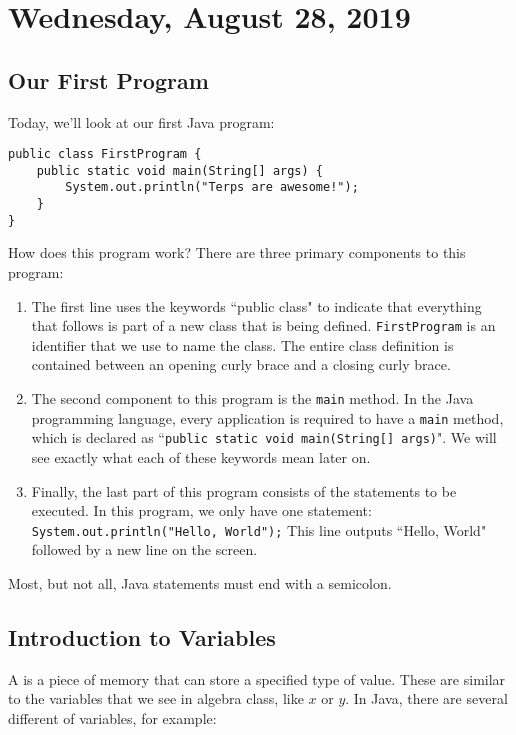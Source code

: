 \section{Wednesday, August 28, 2019}

\subsection{Our First Program}

Today, we'll look at our first Java program:

\begin{lstlisting}
public class FirstProgram {
    public static void main(String[] args) {
        System.out.println("Terps are awesome!");
    }
}
\end{lstlisting}

How does this program work? There are three primary components to this program:

\begin{enumerate}
    \item The first line uses the keywords ``public class" to indicate that everything that follows is part of a new class that is being defined. \verb!FirstProgram! is an identifier that we use to name the class. The entire class definition is contained between an opening curly brace and a closing curly brace. 
    \item The second component to this program is the \verb!main! method. In the Java programming language, every application is required to have a \verb!main! method, which is declared as ``\verb!public static void main(String[] args)!". We will see exactly what each of these keywords mean later on.
    \item Finally, the last part of this program consists of the statements to be executed.  In this program, we only have one statement: \verb!System.out.println("Hello, World");! This line outputs ``Hello, World" followed by a new line on the screen. 
\end{enumerate}

Most, but not all, Java statements must end with a semicolon. 

\subsection{Introduction to Variables}

A  is a piece of memory that can store a specified type of value. These are similar to the variables that we see in algebra class, like $x$ or $y$. In Java, there are several different  of variables, for example:

